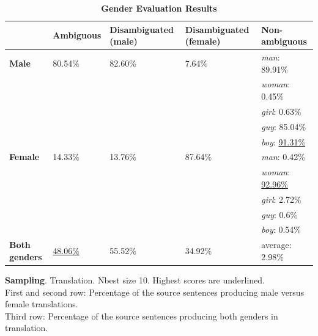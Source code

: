\begin{table}[!htb]
    \ContinuedFloat 
    \begin{subtable}{\textwidth}
        \centering
        \begin{tabularx}{\linewidth}{|X|XXXX|}
            \hline
             & \textbf{Ambiguous} & \textbf{Disambiguated (male)} & \textbf{Disambiguated (female)} & \textbf{Non-ambiguous} \\ \hline
             \textbf{Male} & 80.54\% & 82.60\% & 7.64\% & \textit{man}: 89.91\% \\
             &&&& \textit{woman}: 0.45\% \\
             &&&& \textit{girl}: 0.63\% \\
             &&&& \textit{guy}: 85.04\% \\
             &&&& \textit{boy}: \underline{91.31\%} \\ \hline
             \textbf{Female} & 14.33\% & 13.76\% & 87.64\% & \textit{man}: 0.42\% \\ 
             &&&& \textit{woman}: \underline{92.96\%} \\
             &&&& \textit{girl}: 2.72\% \\
             &&&& \textit{guy}: 0.6\% \\
             &&&& \textit{boy}: 0.54\% \\\hline
             \textbf{Both genders} & \underline{48.06\%} & 55.52\% & 34.92\% & average: 2.98\% \\ \hline
        \end{tabularx}

        \caption{\textbf{Sampling}. Translation. Nbest size 10. Highest scores are underlined. \\ First and second row: Percentage of the source sentences producing male versus female translations. \\ Third row: Percentage of the source sentences producing both genders in translation.}
        \label{tab:gender_percent_sampling}
    \end{subtable}
    
    \caption{\textbf{Gender Evaluation Results}}
    \label{tab:gender_percent}
\end{table}



